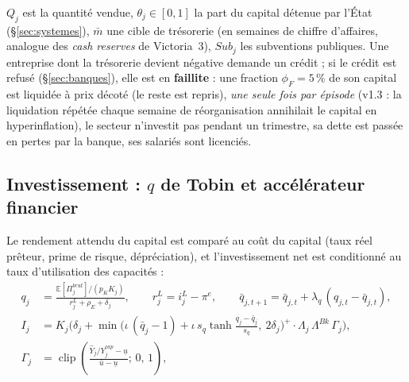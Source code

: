 \documentclass[11pt,a4paper]{article}
\newcommand{\E}{\mathbb{E}}
\newcommand{\clip}[3]{\operatorname{clip}\!\left(#1;\,#2,\,#3\right)}
\begin{document}
$Q_j$ est la quantité vendue, $\theta_j \in [0,1]$ la part du capital détenue par l'État (\S\ref{sec:systemes}), $\bar m$ une cible de trésorerie (en semaines de chiffre d'affaires, analogue des \emph{cash reserves} de Victoria~3), $Sub_j$ les subventions publiques. Une entreprise dont la trésorerie devient négative demande un crédit ; si le crédit est refusé (\S\ref{sec:banques}), elle est en \textbf{faillite} : une fraction $\phi_F=5\,\%$ de son capital est liquidée à prix décoté (le reste est repris), \emph{une seule fois par épisode} (v1.3 : la liquidation répétée chaque semaine de réorganisation annihilait le capital en hyperinflation), le secteur n'investit pas pendant un trimestre, sa dette est passée en pertes par la banque, ses salariés sont licenciés.

\subsection{Investissement : $q$ de Tobin et accélérateur financier}
\label{sec:invest}
Le rendement attendu du capital est comparé au coût du capital (taux réel prêteur, prime de risque, dépréciation), et l'investissement net est conditionné au taux d'utilisation des capacités :
\begin{equation}
\begin{split}
q_j &= \frac{\E[\Pi^{brut}_j] / (p_K K_j)}{r^L_j + \rho_E + \delta_j}, \qquad r^L_j = i^L_j - \pi^e, \qquad \bar q_{j,t+1} = \bar q_{j,t} + \lambda_q\,(q_{j,t} - \bar q_{j,t}),\\
I_j &= K_j\Big(\delta_j + \min\!\Big(\iota\,(\bar q_j - 1) + \iota\, s_q \tanh\!\frac{q_j-\bar q_j}{s_q},\ 2\delta_j\Big)^{\!+}\cdot \Lambda_j\,\Lambda^{Bk}\,\Gamma_j\Big),\\
\Gamma_j &= \clip{\frac{\hat Y_j/Y^{cap}_j - \underline u}{\bar u - \underline u}}{0}{1},
\end{split}
\label{eq:invest}
\end{equation}
\end{document}
